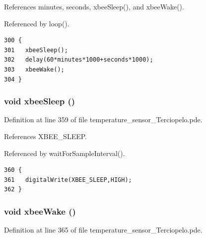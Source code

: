 References minutes, seconds, xbeeSleep(), and xbeeWake().

Referenced by loop().

\begin{Code}\begin{verbatim}300 {
301   xbeeSleep();
302   delay(60*minutes*1000+seconds*1000);
303   xbeeWake();
304 }
\end{verbatim}
\end{Code}


\hypertarget{temperature__sensor___terciopelo_8pde_a06edc5122b70b3231ff87d8234fe759}{
\subsubsection[{xbeeSleep}]{\setlength{\rightskip}{0pt plus 5cm}void xbeeSleep ()}}
\label{temperature__sensor___terciopelo_8pde_a06edc5122b70b3231ff87d8234fe759}




Definition at line 359 of file temperature\_\-sensor\_\-Terciopelo.pde.

References XBEE\_\-SLEEP.

Referenced by waitForSampleInterval().

\begin{Code}\begin{verbatim}360 {
361   digitalWrite(XBEE_SLEEP,HIGH);
362 }
\end{verbatim}
\end{Code}


\hypertarget{temperature__sensor___terciopelo_8pde_884c5dd8e3bb500063c819db197db666}{
\subsubsection[{xbeeWake}]{\setlength{\rightskip}{0pt plus 5cm}void xbeeWake ()}}
\label{temperature__sensor___terciopelo_8pde_884c5dd8e3bb500063c819db197db666}




Definition at line 365 of file temperature\_\-sensor\_\-Terciopelo.pde.

